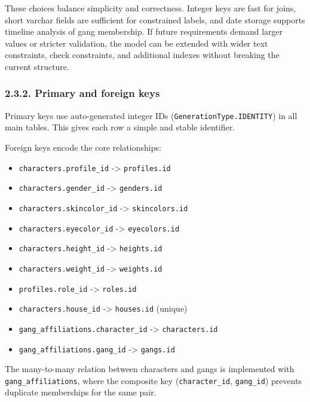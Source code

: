 These choices balance simplicity and correctness. Integer keys are fast
for joins, short varchar fields are sufficient for constrained labels,
and date storage supports timeline analysis of gang membership. If
future requirements demand larger values or stricter validation, the
model can be extended with wider text constraints, check constraints,
and additional indexes without breaking the current structure.

\hypertarget{primary-and-foreign-keys}{%
\subsubsection{2.3.2. Primary and foreign
keys}\label{primary-and-foreign-keys}}

Primary keys use auto-generated integer IDs
(\texttt{GenerationType.IDENTITY}) in all main tables. This gives each
row a simple and stable identifier.

Foreign keys encode the core relationships:

\begin{itemize}
\tightlist
\item
  \texttt{characters.profile\_id} -\textgreater{} \texttt{profiles.id}
\item
  \texttt{characters.gender\_id} -\textgreater{} \texttt{genders.id}
\item
  \texttt{characters.skincolor\_id} -\textgreater{}
  \texttt{skincolors.id}
\item
  \texttt{characters.eyecolor\_id} -\textgreater{} \texttt{eyecolors.id}
\item
  \texttt{characters.height\_id} -\textgreater{} \texttt{heights.id}
\item
  \texttt{characters.weight\_id} -\textgreater{} \texttt{weights.id}
\item
  \texttt{profiles.role\_id} -\textgreater{} \texttt{roles.id}
\item
  \texttt{characters.house\_id} -\textgreater{} \texttt{houses.id}
  (unique)
\item
  \texttt{gang\_affiliations.character\_id} -\textgreater{}
  \texttt{characters.id}
\item
  \texttt{gang\_affiliations.gang\_id} -\textgreater{} \texttt{gangs.id}
\end{itemize}

The many-to-many relation between characters and gangs is implemented
with \texttt{gang\_affiliations}, where the composite key
(\texttt{character\_id}, \texttt{gang\_id}) prevents duplicate
memberships for the same pair.


